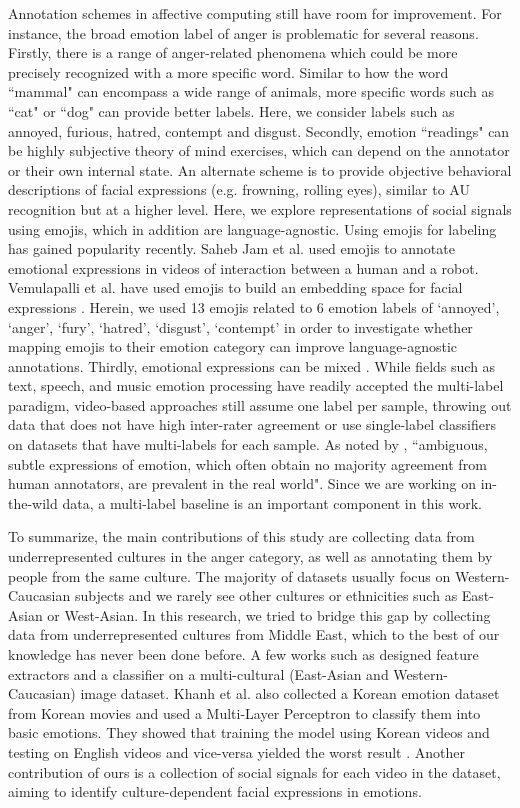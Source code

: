 \documentclass[letterpaper, 10 pt, conference]{ieeeconf}  \usepackage{FG2021}
\begin{document}
Annotation schemes in affective computing still have room for improvement. For instance, the broad emotion label of anger is problematic for several reasons.  Firstly, there is a range of anger-related phenomena which could be more precisely recognized with  a more specific word. Similar to how the word ``mammal" can encompass a wide range of animals, more specific words such as ``cat" or ``dog" can provide better labels. Here, we consider labels such as annoyed, furious, hatred, contempt and disgust. 
Secondly,  emotion ``readings" can be highly subjective theory of mind exercises, which can depend on the annotator or their own internal state. An alternate scheme is to provide objective behavioral descriptions of facial expressions (e.g. frowning, rolling eyes), similar to AU recognition but at a higher level. Here, we explore representations of social signals using emojis, which in addition are language-agnostic.
Using emojis for labeling has gained popularity recently. Saheb Jam et al. \cite{Saheb_Jam_2021} used emojis to annotate emotional expressions in videos of interaction between a human and a robot.  Vemulapalli et al. have used emojis to build an embedding space for facial expressions \cite{emoji-emb}. Herein, we used 13 emojis related to 6 emotion labels of ‘annoyed’, ‘anger’, ‘fury’, ‘hatred’, ‘disgust’, ‘contempt’ in order to investigate whether mapping emojis to their emotion category can improve language-agnostic annotations. Thirdly, emotional expressions can be mixed \cite{DuE1454}. While fields such as text, speech, and music emotion processing have readily accepted the multi-label paradigm, video-based approaches still assume one label per sample, throwing out data that does not have high inter-rater agreement or use single-label classifiers on datasets that have multi-labels for each sample. As noted by \cite{ml_speech}, ``ambiguous, subtle expressions of emotion, which often obtain no majority agreement from human annotators, are prevalent in the real world". Since we are working on in-the-wild data, a multi-label baseline is an important component in this work.

To summarize, the main contributions of this study are collecting data from underrepresented cultures in the anger category, as well as annotating them by people from the same culture. The majority of datasets usually focus on Western-Caucasian subjects and we rarely see other cultures or ethnicities such as East-Asian or West-Asian. In this research, we tried to bridge this gap by collecting data from underrepresented cultures from Middle East, which  to the best of our knowledge has never been done before. A few works such as \cite{Benitez-Garcia} designed feature extractors and a classifier on a multi-cultural (East-Asian and Western-Caucasian) image dataset.  Khanh et al. also collected a Korean emotion dataset from Korean movies and used a Multi-Layer Perceptron to classify them into basic emotions. They showed that training the model using Korean videos and testing on English videos and vice-versa yielded the worst result \cite{korean-dataset}. 
Another contribution of ours is a collection of social signals for each video in the dataset, aiming to identify culture-dependent facial expressions in emotions.
\end{document}
